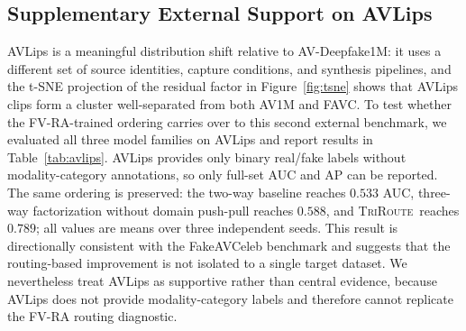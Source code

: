 \documentclass{article}
\newcommand{\method}{\textsc{TriRoute}}
\begin{document}


\subsection{Supplementary External Support on AVLips}

AVLips is a meaningful distribution shift relative to AV-Deepfake1M: it uses a different set of source identities, capture conditions, and synthesis pipelines, and the t-SNE projection of the residual factor in Figure~\ref{fig:tsne} shows that AVLips clips form a cluster well-separated from both AV1M and FAVC. To test whether the FV-RA-trained ordering carries over to this second external benchmark, we evaluated all three model families on AVLips \citep{shi2022avhubert} and report results in Table~\ref{tab:avlips}. AVLips provides only binary real/fake labels without modality-category annotations, so only full-set AUC and AP can be reported. The same ordering is preserved: the two-way baseline reaches $0.533$ AUC, three-way factorization without domain push-pull reaches $0.588$, and \method\ reaches $0.789$; all values are means over three independent seeds. This result is directionally consistent with the FakeAVCeleb benchmark and suggests that the routing-based improvement is not isolated to a single target dataset. We nevertheless treat AVLips as supportive rather than central evidence, because AVLips does not provide modality-category labels and therefore cannot replicate the FV-RA routing diagnostic.
\end{document}

